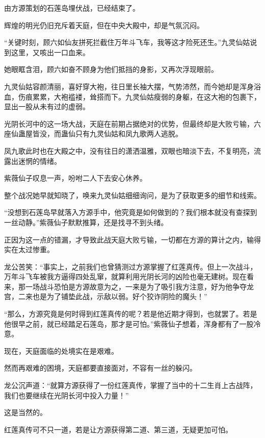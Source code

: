
\begin{this_body}

由方源策划的石莲岛埋伏战，已经结束了。

辉煌的明光仍旧充斥着天庭，但在中央大殿中，却是气氛沉闷。

“关键时刻，顾六如仙友拼死拦截住万年斗飞车，我等这才险死还生。”九灵仙姑说到这里，又咳出一口血来。

她眼眶含泪，顾六如奋不顾身为他们抵挡的身影，又再次浮现眼前。

九灵仙姑容颜清丽，喜好穿大袍，往日里长袖大摆，气势沛然，而今她却是浑身浴血，伤痕累累，大袍褴褛，耸搭而下。九灵仙姑瘦弱的身躯，在这大袍的包裹下，显出一股从未有过的虚弱。

光阴长河中的这一场大战，天庭在前期占据绝对的优势，但最终却是大败亏输，六座仙蛊屋皆没，而蛊仙只有九灵仙姑和凤九歌两人逃脱。

凤九歌此时也在大殿之中，没有往日的潇洒温雅，双眼也暗淡下去，不复明亮，流露出迷惘的情绪。

紫薇仙子叹息一声，吩咐二人下去安心休养。

整个战况她早就知晓了，唤来九灵仙姑细细询问，是为了获取更多的细节和线索。

“没想到石莲岛早就落入方源手中，他究竟是如何做到的？我们根本就没有查探到一丝动静。”紫薇仙子默默推算，还是找寻不到头绪。

正因为这一点的错漏，才导致此战天庭大败亏输，一切都在方源的算计之内，输得实在太过惨重。

龙公苦笑：“事实上，之前我们也曾猜测过方源掌握了红莲真传。但上一次战斗，万年斗飞车被我方逼得四处乱窜，就算利用光阴长河的凶险也毫无建树。现在看来，那一场战斗恐怕是方源故意为之，一来是为了吸引我方注意，好为他争夺龙宫，二来也是为了铺垫此战，示敌以弱。好个狡诈阴险的魔头！”

“那么，方源究竟是何时得到红莲真传的呢？若是他近期才得到，也就罢了。若是他很早之前，就已经踏足石莲岛，那才是可怕。”紫薇仙子想着，浑身都有了一股冷意。

现在，天庭面临的处境实在是艰难。

然而再艰难的困境，天庭都要直接面对，不容有一丝的躲闪。

龙公沉声道：“就算方源获得了一份红莲真传，掌握了当中的十二生肖上古战阵，我们也要继续在光阴长河中投入力量！”

这是当然的。

红莲真传可不只一道，若是让方源获得第二道、第三道，无疑更加可怕。


\end{this_body}
